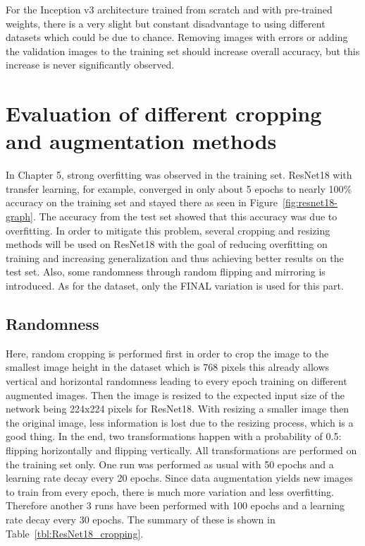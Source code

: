 For the Inception v3 architecture trained from scratch and with pre-trained weights, there is a very slight but constant disadvantage to using different datasets which could be due to chance. Removing images with errors or adding the validation images to the training set should increase overall accuracy, but this increase is never significantly observed.












\section{Evaluation of different cropping and augmentation methods}

In Chapter 5, strong overfitting was observed in the training set. ResNet18 with transfer learning, for example, converged in only about 5 epochs to nearly 100\% accuracy on the training set and stayed there as seen in Figure~\ref{fig:resnet18-graph}. The accuracy from the test set showed that this accuracy was due to overfitting. In order to mitigate this problem, several cropping and resizing methods will be used on ResNet18 with the goal of reducing overfitting on training and increasing generalization and thus achieving better results on the test set. Also, some randomness through random flipping and mirroring is introduced. As for the dataset, only the FINAL variation is used for this part.

\subsection{Randomness}

Here, random cropping is performed first in order to crop the image to the smallest image height in the dataset which is 768 pixels this already allows vertical and horizontal randomness leading to every epoch training on different augmented images. Then the image is resized to the expected input size of the network being 224x224 pixels for ResNet18. With resizing a  smaller image then the original image, less information is lost due to the resizing process, which is a good thing. In the end, two transformations happen with a probability of 0.5: flipping horizontally and flipping vertically. All transformations are performed on the training set only. One run was performed as usual with 50 epochs and a  learning rate decay every 20 epochs. Since data augmentation yields new images to train from every epoch, there is much more variation and less overfitting. Therefore another 3 runs have been performed with 100 epochs and a learning rate decay every  30 epochs. The summary of these is shown in Table~\ref{tbl:ResNet18_cropping}. \\


